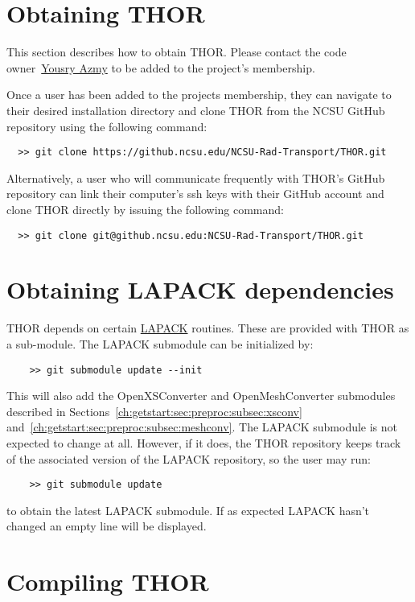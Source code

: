 \section{Obtaining THOR}

This section describes how to obtain \ac{THOR}.
Please contact the code owner~\href{mailto:yyazmy@ncsu.edu}{Yousry Azmy} to be added to the project's membership.

Once a user has been added to the projects membership, they can navigate to their desired installation directory and clone \ac{THOR} from the \ac{NCSU} GitHub repository using the following command:
\begin{verbatim}
  >> git clone https://github.ncsu.edu/NCSU-Rad-Transport/THOR.git
\end{verbatim}
Alternatively, a user who will communicate frequently with \ac{THOR}'s GitHub repository can link their computer's ssh keys with their GitHub account and clone \ac{THOR} directly by issuing the following command:
\begin{verbatim}
  >> git clone git@github.ncsu.edu:NCSU-Rad-Transport/THOR.git
\end{verbatim}

\section{Obtaining LAPACK dependencies}

\ac{THOR} depends on certain \href{http://www.netlib.org/lapack/}{\ac{LAPACK}} routines.
These are provided with \ac{THOR} as a sub-module.
The \ac{LAPACK} submodule can be initialized by:
\begin{verbatim}
    >> git submodule update --init
\end{verbatim}
This will also add the OpenXSConverter and OpenMeshConverter submodules described in Sections~\ref{ch:getstart:sec:preproc:subsec:xsconv} and~\ref{ch:getstart:sec:preproc:subsec:meshconv}.
The \ac{LAPACK} submodule is not expected to change at all.
However, if it does, the \ac{THOR} repository keeps track of the associated version of the \ac{LAPACK} repository, so the user may run:
\begin{verbatim}
    >> git submodule update
\end{verbatim}
to obtain the latest \ac{LAPACK} submodule.
If as expected \ac{LAPACK} hasn't changed an empty line will be displayed.

\section{Compiling THOR}

